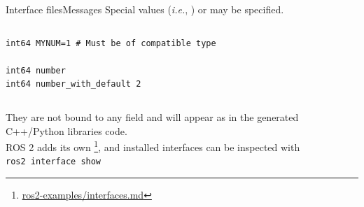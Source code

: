 \begin{frame}[fragile]{Interface files}{Messages}
	Special values (\emph{i.e.}, ) or  may be specified.

	\begin{columns}
		\begin{lstlisting}[language=ros2msg, caption=Definition of an example message with a constant and a default value.]
int64 MYNUM=1 # Must be of compatible type

int64 number
int64 number_with_default 2\end{lstlisting}
	\end{columns}

	They are not bound to any field and will appear as  in the generated C++/Python libraries code.\\
	ROS 2 adds its own \footnote{\href{https://github.com/IntelligentSystemsLabUTV/ros2-examples/blob/humble/interfaces.md}{\color{blue}\underline{ros2-examples/interfaces.md}}}, and installed interfaces can be inspected with\\
  \medskip
	\texttt{ros2 interface show}
\end{frame}

